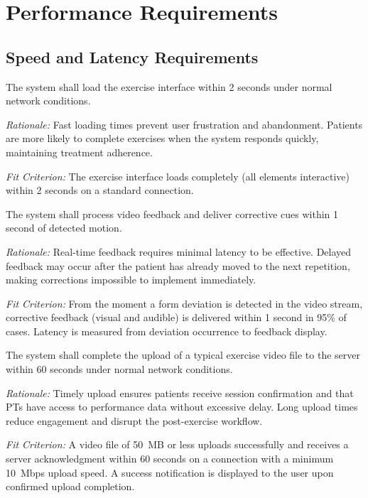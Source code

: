 \documentclass[12pt]{article}
\newcommand{\rationale}[1]{\par\emph{Rationale:} #1}
\newcommand{\fitcrit}[1]{\par\emph{Fit Criterion:} #1}
\begin{document}
\section{Performance Requirements}

\subsection{Speed and Latency Requirements}
\begin{reqlist}
	\item[PR-SL 1.] The system shall load the exercise interface within 2 seconds under normal network conditions.
	\rationale{Fast loading times prevent user frustration and abandonment. Patients are more likely to complete exercises when the system responds quickly, maintaining treatment adherence.}
	\fitcrit{The exercise interface loads completely (all elements interactive) within 2 seconds on a standard connection.}
	
	\item[PR-SL 2.] The system shall process video feedback and deliver corrective cues within 1 second of detected motion.
	\rationale{Real-time feedback requires minimal latency to be effective. Delayed feedback may occur after the patient has already moved to the next repetition, making corrections impossible to implement immediately.}
	\fitcrit{From the moment a form deviation is detected in the video stream, corrective feedback (visual and audible) is delivered within 1 second in 95\% of cases. Latency is measured from deviation occurrence to feedback display.}
	
	\item[PR-SL 3.] The system shall complete the upload of a typical exercise video file to the server within 60 seconds under normal network conditions.
	\rationale{Timely upload ensures patients receive session confirmation and that PTs have access to performance data without excessive delay. Long upload times reduce engagement and disrupt the post-exercise workflow.}
	\fitcrit{A video file of 50~MB or less uploads successfully and receives a server acknowledgment within 60 seconds on a connection with a minimum 10~Mbps upload speed. A success notification is displayed to the user upon confirmed upload completion.}
	\end{reqlist}
\end{document}
